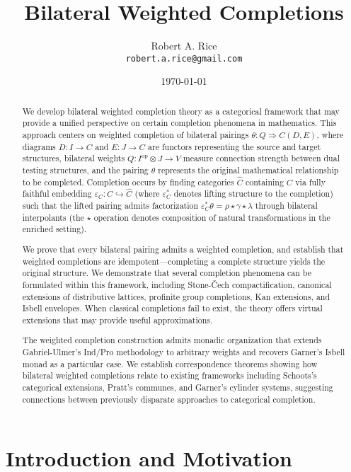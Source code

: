 \documentclass[11pt]{article}
\title{Bilateral Weighted Completions}
\author{Robert A. Rice\\
\texttt{robert.a.rice@gmail.com}}
\date{\today}
\theoremstyle{plain}
\theoremstyle{definition}
\theoremstyle{remark}
\begin{document}
\maketitle

\begin{abstract}
We develop bilateral weighted completion theory as a categorical framework that may provide a unified perspective on certain completion phenomena in mathematics. This approach centers on weighted completion of bilateral pairings $\theta : Q \Rightarrow C(D, E)$, where diagrams $D : I \to C$ and $E : J \to C$ are functors representing the source and target structures, bilateral weights $Q : I^{\mathrm{op}} \otimes J \to V$ measure connection strength between dual testing structures, and the pairing $\theta$ represents the original mathematical relationship to be completed. Completion occurs by finding categories $\widehat{C}$ containing $C$ via fully faithful embedding $\varepsilon_C : C \hookrightarrow \widehat{C}$ (where $\varepsilon_C^*$ denotes lifting structure to the completion) such that the lifted pairing admits factorization $\varepsilon_C^* \theta = \rho \star \gamma \star \lambda$ through bilateral interpolants (the $\star$ operation denotes composition of natural transformations in the enriched setting).

We prove that every bilateral pairing admits a weighted completion, and establish that weighted completions are idempotent---completing a complete structure yields the original structure. We demonstrate that several completion phenomena can be formulated within this framework, including Stone-\v{C}ech compactification, canonical extensions of distributive lattices, profinite group completions, Kan extensions, and Isbell envelopes. When classical completions fail to exist, the theory offers virtual extensions that may provide useful approximations.

The weighted completion construction admits monadic organization that extends Gabriel-Ulmer's Ind/Pro methodology to arbitrary weights and recovers Garner's Isbell monad as a particular case. We establish correspondence theorems showing how bilateral weighted completions relate to existing frameworks including Schoots's categorical extensions, Pratt's communes, and Garner's cylinder systems, suggesting connections between previously disparate approaches to categorical completion.
\end{abstract}

\section{Introduction and Motivation}
\end{document}
